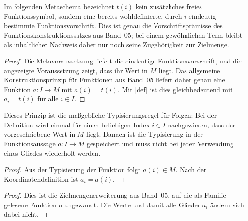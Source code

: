 \documentclass[main.tex]{subfiles}
\begin{document}
Im folgenden Metaschema bezeichnet \(t(i)\) kein zusätzliches freies
Funktionssymbol, sondern eine bereits wohldefinierte, durch \(i\) eindeutig
bestimmte Funktionsvorschrift. Dies ist genau die Vorschriftsprämisse des
Funktionskonstruktionssatzes aus Band~05; bei einem gewöhnlichen Term bleibt
als inhaltlicher Nachweis daher nur noch seine Zugehörigkeit zur Zielmenge.

\begin{proof}
Die Metavoraussetzung liefert die eindeutige Funktionsvorschrift, und die
angezeigte Voraussetzung zeigt, dass ihr Wert in \(M\) liegt. Das allgemeine
Konstruktionsprinzip für Funktionen aus Band~05 liefert daher
genau eine Funktion \(a\colon I\to M\) mit \(a(i)=t(i)\). Mit
[def] ist dies gleichbedeutend mit
\(a_i=t(i)\) für alle \(i\in I\).
\end{proof}

Dieses Prinzip ist die maßgebliche Typisierungsregel für Folgen: Bei der
Definition wird einmal für einen beliebigen Index \(i\in I\) nachgewiesen,
dass der vorgeschriebene Wert in \(M\) liegt. Danach ist die Typisierung in
der Funktionsaussage \(a\colon I\to M\) gespeichert und muss nicht bei jeder
Verwendung eines Gliedes wiederholt werden.

\begin{proof}
Aus der Typisierung der Funktion folgt \(a(i)\in M\). Nach der
Koordinatendefinition ist \(a_i=a(i)\).
\end{proof}

\begin{proof}
Dies ist die Zielmengenerweiterung aus Band~05, auf die als Familie gelesene
Funktion \(a\) angewandt. Die Werte und damit alle Glieder \(a_i\) ändern
sich dabei nicht.
\end{proof}
\end{document}
